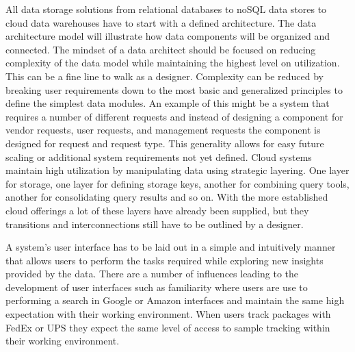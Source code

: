 \documentclass[sigconf]{acmart}
\begin{document}
All data storage solutions from relational databases to noSQL data stores to cloud data warehouses have to start with a defined architecture. The data architecture model will illustrate how data components will be organized and connected. The mindset of a data architect should be focused on reducing complexity of the data model while maintaining the highest level on utilization. This can be a fine line to walk as a designer. Complexity can be reduced by breaking user requirements down to the most basic and generalized principles to define the simplest data modules. An example of this might be a system that requires a number of different requests and instead of designing a component for vendor requests, user requests, and management requests the component is designed for request and request type. This generality allows for easy future scaling or additional system requirements not yet defined. Cloud systems maintain high utilization by manipulating data using strategic layering. One layer for storage, one layer for defining storage keys, another for combining query tools, another for consolidating query results and so on. With the more established cloud offerings a lot of these layers have already been supplied, but they transitions and interconnections still have to be outlined by a designer\cite{Saltzer}.

A system's user interface has to be laid out in a simple and intuitively manner that allows users to perform the tasks required while exploring new insights provided by the data. There are a number of influences leading to the development of user interfaces such as familiarity where users are use to performing a search in Google or Amazon interfaces and maintain the same high expectation with their working environment. When users track packages with FedEx or UPS they expect the same level of access to sample tracking within their working environment. 
\end{document}
